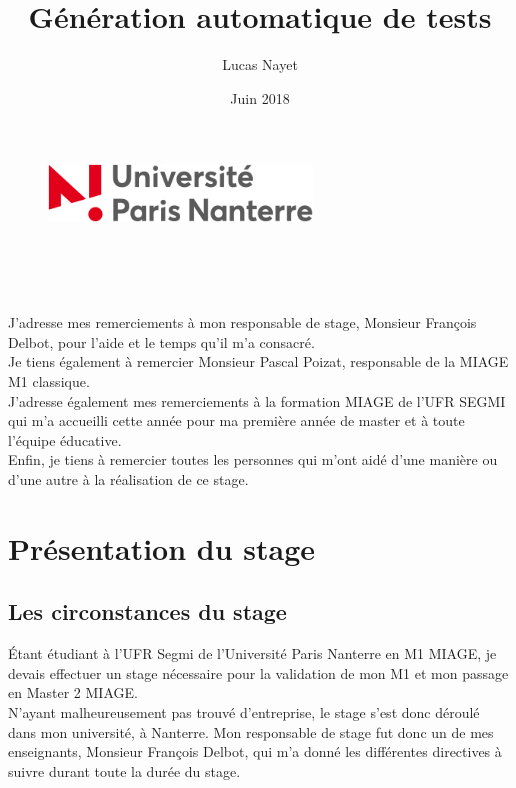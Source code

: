 \documentclass[12pt,twoside]{report}
\title{Génération automatique de tests}
\author{Lucas Nayet}
\date{Juin 2018}
\begin{document}
\makeatletter 
\begin{titlepage} 
\centering  
\vfill 
\begin{figure}[h]
\includegraphics[width = 70mm]{UPN-logo.jpg}
\end{figure}
\vspace{1.6cm}
{\LARGE {\@title}}\\ 
\vspace{1.6cm}
{\large \@author}\\ 
\vspace{1cm} {\large \@date}\\
\vfill
\end{titlepage} 
\makeatother

\thispagestyle{empty}
\setcounter{page}{0}
J'adresse mes remerciements à mon responsable de stage, Monsieur François Delbot, pour l'aide et le temps qu'il m'a consacré.\\
Je tiens également à remercier Monsieur Pascal Poizat, responsable de la MIAGE M1 classique.\\
J'adresse également mes remerciements à la formation MIAGE de l'UFR SEGMI qui m'a accueilli cette année pour ma première année de master et à toute l'équipe éducative.\\
Enfin, je tiens à remercier toutes les personnes qui m'ont aidé d'une manière ou d'une autre à la réalisation de ce stage.

\tableofcontents

\newpage
\color{red}
\chapter{Présentation du stage}
\color{black}
\section {Les circonstances du stage}
Étant étudiant à l'UFR Segmi de l'Université Paris Nanterre en M1 MIAGE, je devais effectuer un stage nécessaire pour la validation de mon M1 et mon passage en Master 2 MIAGE.\\ 
N'ayant malheureusement pas trouvé d'entreprise, le stage s'est donc déroulé dans mon université, à Nanterre. Mon responsable de stage fut donc un de mes enseignants, Monsieur François Delbot, qui m'a donné les différentes directives à suivre durant toute la durée du stage.
\end{document}

